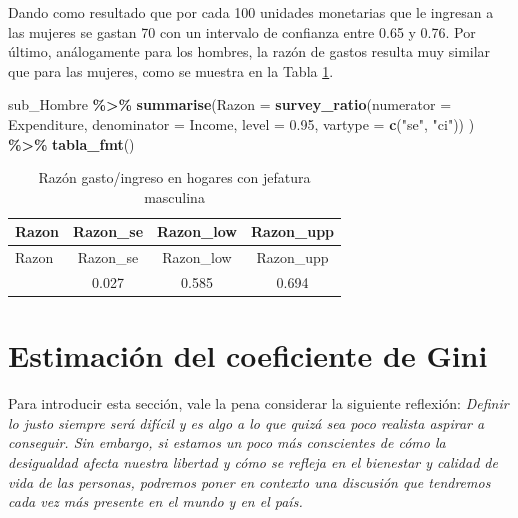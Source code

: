 \documentclass[
  spanish,
  12pt,
]{book}
\newenvironment{Shaded}{\begin{snugshade}}{\end{snugshade}}
\newcommand{\AttributeTok}[1]{\textcolor[rgb]{0.13,0.29,0.53}{#1}}
\newcommand{\FloatTok}[1]{\textcolor[rgb]{0.00,0.00,0.81}{#1}}
\newcommand{\FunctionTok}[1]{\textcolor[rgb]{0.13,0.29,0.53}{\textbf{#1}}}
\newcommand{\NormalTok}[1]{#1}
\newcommand{\SpecialCharTok}[1]{\textcolor[rgb]{0.81,0.36,0.00}{\textbf{#1}}}
\newcommand{\StringTok}[1]{\textcolor[rgb]{0.31,0.60,0.02}{#1}}
\begin{document}
Dando como resultado que por cada 100 unidades monetarias que le ingresan a las mujeres se gastan 70 con un intervalo de confianza entre 0.65 y 0.76. Por último, análogamente para los hombres, la razón de gastos resulta muy similar que para las mujeres, como se muestra en la Tabla \ref{tab:tab-razon-gasto-ingreso-hombre}.

\begin{Shaded}
\begin{Highlighting}[]
\NormalTok{sub\_Hombre }\SpecialCharTok{\%\textgreater{}\%} 
  \FunctionTok{summarise}\NormalTok{(}\AttributeTok{Razon =} \FunctionTok{survey\_ratio}\NormalTok{(}\AttributeTok{numerator =}\NormalTok{ Expenditure,}
                                 \AttributeTok{denominator =}\NormalTok{ Income,}
                                 \AttributeTok{level =} \FloatTok{0.95}\NormalTok{,}
                                 \AttributeTok{vartype =}  \FunctionTok{c}\NormalTok{(}\StringTok{"se"}\NormalTok{, }\StringTok{"ci"}\NormalTok{))}
\NormalTok{            ) }\SpecialCharTok{\%\textgreater{}\%}
  \FunctionTok{tabla\_fmt}\NormalTok{()}
\end{Highlighting}
\end{Shaded}

\begin{longtable}[]{@{}lccc@{}}
\caption{\label{tab:tab-razon-gasto-ingreso-hombre}Razón gasto/ingreso en hogares con jefatura masculina}\tabularnewline
\toprule\noalign{}
Razon & Razon\_se & Razon\_low & Razon\_upp \\
\midrule\noalign{}
\endfirsthead
\toprule\noalign{}
Razon & Razon\_se & Razon\_low & Razon\_upp \\
\midrule\noalign{}
\endhead
\bottomrule\noalign{}
\endlastfoot
0.639 & 0.027 & 0.585 & 0.694 \\
\end{longtable}

\section{Estimación del coeficiente de Gini}\label{estimaciuxf3n-del-coeficiente-de-gini}

Para introducir esta sección, vale la pena considerar la siguiente reflexión: \emph{Definir lo justo siempre será difícil y es algo a lo que quizá sea poco realista aspirar a conseguir. Sin embargo, si estamos un poco más conscientes de cómo la desigualdad afecta nuestra libertad y cómo se refleja en el bienestar y calidad de vida de las personas, podremos poner en contexto una discusión que tendremos cada vez más presente en el mundo y en el país.}
\end{document}
